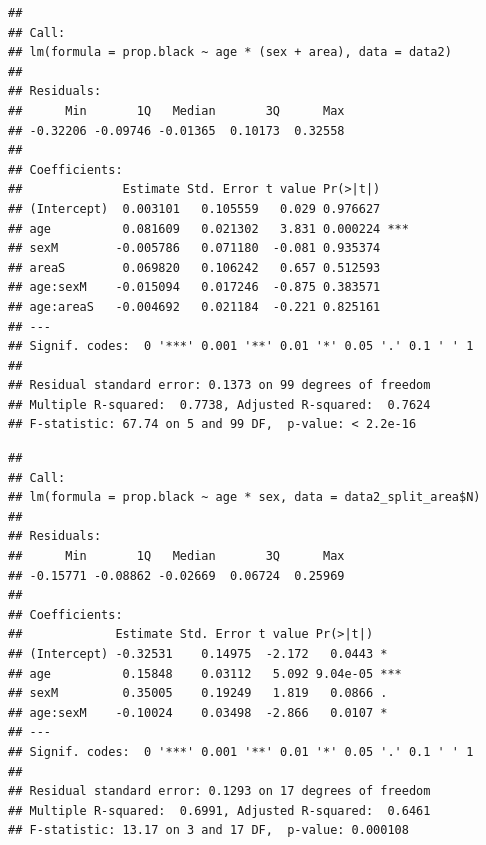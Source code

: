 \documentclass[
]{article}
\newenvironment{Shaded}{\begin{snugshade}}{\end{snugshade}}
\newcommand{\AttributeTok}[1]{\textcolor[rgb]{0.77,0.63,0.00}{#1}}
\newcommand{\FunctionTok}[1]{\textcolor[rgb]{0.00,0.00,0.00}{#1}}
\newcommand{\NormalTok}[1]{#1}
\newcommand{\OtherTok}[1]{\textcolor[rgb]{0.56,0.35,0.01}{#1}}
\newcommand{\SpecialCharTok}[1]{\textcolor[rgb]{0.00,0.00,0.00}{#1}}
\begin{document}
\begin{verbatim}
## 
## Call:
## lm(formula = prop.black ~ age * (sex + area), data = data2)
## 
## Residuals:
##      Min       1Q   Median       3Q      Max 
## -0.32206 -0.09746 -0.01365  0.10173  0.32558 
## 
## Coefficients:
##              Estimate Std. Error t value Pr(>|t|)    
## (Intercept)  0.003101   0.105559   0.029 0.976627    
## age          0.081609   0.021302   3.831 0.000224 ***
## sexM        -0.005786   0.071180  -0.081 0.935374    
## areaS        0.069820   0.106242   0.657 0.512593    
## age:sexM    -0.015094   0.017246  -0.875 0.383571    
## age:areaS   -0.004692   0.021184  -0.221 0.825161    
## ---
## Signif. codes:  0 '***' 0.001 '**' 0.01 '*' 0.05 '.' 0.1 ' ' 1
## 
## Residual standard error: 0.1373 on 99 degrees of freedom
## Multiple R-squared:  0.7738, Adjusted R-squared:  0.7624 
## F-statistic: 67.74 on 5 and 99 DF,  p-value: < 2.2e-16
\end{verbatim}

\begin{Shaded}
\end{Shaded}

\begin{verbatim}
## 
## Call:
## lm(formula = prop.black ~ age * sex, data = data2_split_area$N)
## 
## Residuals:
##      Min       1Q   Median       3Q      Max 
## -0.15771 -0.08862 -0.02669  0.06724  0.25969 
## 
## Coefficients:
##             Estimate Std. Error t value Pr(>|t|)    
## (Intercept) -0.32531    0.14975  -2.172   0.0443 *  
## age          0.15848    0.03112   5.092 9.04e-05 ***
## sexM         0.35005    0.19249   1.819   0.0866 .  
## age:sexM    -0.10024    0.03498  -2.866   0.0107 *  
## ---
## Signif. codes:  0 '***' 0.001 '**' 0.01 '*' 0.05 '.' 0.1 ' ' 1
## 
## Residual standard error: 0.1293 on 17 degrees of freedom
## Multiple R-squared:  0.6991, Adjusted R-squared:  0.6461 
## F-statistic: 13.17 on 3 and 17 DF,  p-value: 0.000108
\end{verbatim}
\end{document}
